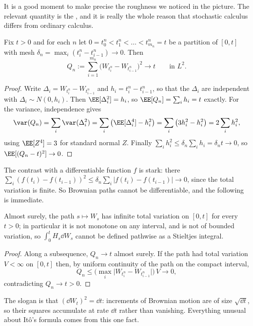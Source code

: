 It is a good moment to make precise the roughness we noticed in the picture. The relevant quantity is the , and it is really the whole reason that stochastic calculus differs from ordinary calculus.

\begin{theorem}\label{thm:qv}
	Fix $t>0$ and for each $n$ let $0 = t^n_0 < t^n_1 < \dots < t^n_{m_n} = t$ be a partition of $[0,t]$ with mesh $\delta_n = \max_i(t^n_i - t^n_{i-1}) \to 0$. Then
	$$
	Q_n := \sum_{i=1}^{m_n}\big(W_{t^n_i} - W_{t^n_{i-1}}\big)^2 \longrightarrow t \qquad\text{in } L^2.
	$$
\end{theorem}

\begin{proof}
	Write $\Delta_i = W_{t^n_i}-W_{t^n_{i-1}}$ and $h_i = t^n_i - t^n_{i-1}$, so that the $\Delta_i$ are independent with $\Delta_i \sim N(0,h_i)$. Then $\EE[\Delta_i^2] = h_i$, so $\EE[Q_n] = \sum_i h_i = t$ exactly. For the variance, independence gives
	$$
	\var(Q_n) = \sum_{i}\var(\Delta_i^2) = \sum_i \big(\EE[\Delta_i^4] - h_i^2\big) = \sum_i \big(3h_i^2 - h_i^2\big) = 2\sum_i h_i^2,
	$$
	using $\EE[Z^4] = 3$ for standard normal $Z$. Finally $\sum_i h_i^2 \leq \delta_n\sum_i h_i = \delta_n t \to 0$, so $\EE[(Q_n - t)^2]\to0$.
\end{proof}

The contrast with a differentiable function $f$ is stark: there $\sum_i(f(t_i)-f(t_{i-1}))^2 \leq \delta_n\sum_i|f(t_i)-f(t_{i-1})|\to0$, since the total variation is finite. So Brownian paths cannot be differentiable, and the following is immediate.

\begin{corollary}
	Almost surely, the path $s \mapsto W_s$ has infinite total variation on $[0,t]$ for every $t>0$; in particular it is not monotone on any interval, and is not of bounded variation, so $\int_0^t H_s\dd W_s$ cannot be defined pathwise as a Stieltjes integral.
\end{corollary}

\begin{proof}
	Along a subsequence, $Q_n \to t$ almost surely. If the path had total variation $V < \infty$ on $[0,t]$ then, by uniform continuity of the path on the compact interval,
	$$
	Q_n \leq \Big(\max_i \big|W_{t^n_i} - W_{t^n_{i-1}}\big|\Big)\, V \longrightarrow 0,
	$$
	contradicting $Q_n \to t > 0$.
\end{proof}

The slogan is that $(\dd W_t)^2 = \dd t$: increments of Brownian motion are of size $\sqrt{\dd t}$, so their squares accumulate at rate $\dd t$ rather than vanishing. Everything unusual about It\^o's formula comes from this one fact.

